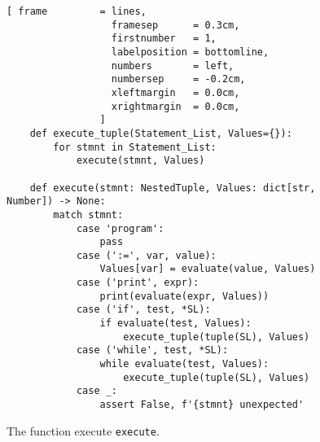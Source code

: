 \begin{figure}[!ht]
\centering
\begin{Verbatim}[ frame         = lines, 
                  framesep      = 0.3cm, 
                  firstnumber   = 1,
                  labelposition = bottomline,
                  numbers       = left,
                  numbersep     = -0.2cm,
                  xleftmargin   = 0.0cm,
                  xrightmargin  = 0.0cm,
                ]
    def execute_tuple(Statement_List, Values={}):
        for stmnt in Statement_List:
            execute(stmnt, Values)
    
    def execute(stmnt: NestedTuple, Values: dict[str, Number]) -> None:
        match stmnt:
            case 'program':
                pass
            case (':=', var, value):
                Values[var] = evaluate(value, Values)
            case ('print', expr):
                print(evaluate(expr, Values))
            case ('if', test, *SL):
                if evaluate(test, Values):
                    execute_tuple(tuple(SL), Values)
            case ('while', test, *SL):
                while evaluate(test, Values):
                    execute_tuple(tuple(SL), Values)
            case _:
                assert False, f'{stmnt} unexpected'
\end{Verbatim}
\vspace*{-0.3cm}
\caption{The function execute \texttt{execute}.}
\label{fig:Interpreter.ipynb:execute}
\end{figure}

